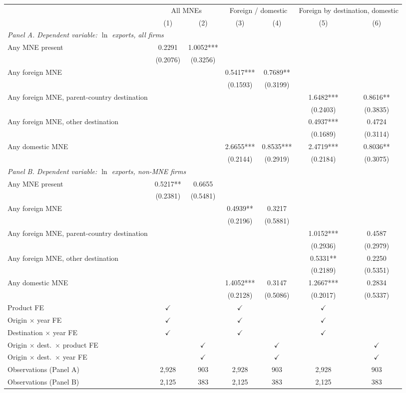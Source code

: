 \begin{tabular}{lcccccc} \hline
 & \multicolumn{2}{c}{All MNEs} & \multicolumn{2}{c}{Foreign / domestic} & \multicolumn{2}{c}{Foreign by destination, domestic} \\
 & (1) & (2) & (3) & (4) & (5) & (6) \\ \hline
\multicolumn{7}{l}{\textit{Panel A. Dependent variable: $\ln$ exports, all firms}} \\
Any MNE present & 0.2291 & 1.0052*** &  &  &  &  \\
 & (0.2076) & (0.3256) &  &  &  &  \\
Any foreign MNE &  &  & 0.5417*** & 0.7689** &  &  \\
 &  &  & (0.1593) & (0.3199) &  &  \\
Any foreign MNE, parent-country destination &  &  &  &  & 1.6482*** & 0.8616** \\
 &  &  &  &  & (0.2403) & (0.3835) \\
Any foreign MNE, other destination &  &  &  &  & 0.4937*** & 0.4724 \\
 &  &  &  &  & (0.1689) & (0.3114) \\
Any domestic MNE &  &  & 2.6655*** & 0.8535*** & 2.4719*** & 0.8036** \\
 &  &  & (0.2144) & (0.2919) & (0.2184) & (0.3075) \\
\midrule
\multicolumn{7}{l}{\textit{Panel B. Dependent variable: $\ln$ exports, non-MNE firms}} \\
Any MNE present & 0.5217** & 0.6655 &  &  &  &  \\
 & (0.2381) & (0.5481) &  &  &  &  \\
Any foreign MNE &  &  & 0.4939** & 0.3217 &  &  \\
 &  &  & (0.2196) & (0.5881) &  &  \\
Any foreign MNE, parent-country destination &  &  &  &  & 1.0152*** & 0.4587 \\
 &  &  &  &  & (0.2936) & (0.2979) \\
Any foreign MNE, other destination &  &  &  &  & 0.5331** & 0.2250 \\
 &  &  &  &  & (0.2189) & (0.5351) \\
Any domestic MNE &  &  & 1.4052*** & 0.3147 & 1.2667*** & 0.2834 \\
 &  &  & (0.2128) & (0.5086) & (0.2017) & (0.5337) \\
\hline
Product FE & $\checkmark$ &  & $\checkmark$ &  & $\checkmark$ &  \\
Origin $\times$ year FE & $\checkmark$ &  & $\checkmark$ &  & $\checkmark$ &  \\
Destination $\times$ year FE & $\checkmark$ &  & $\checkmark$ &  & $\checkmark$ &  \\
Origin $\times$ dest.\ $\times$ product FE &  & $\checkmark$ &  & $\checkmark$ &  & $\checkmark$ \\
Origin $\times$ dest.\ $\times$ year FE &  & $\checkmark$ &  & $\checkmark$ &  & $\checkmark$ \\
Observations (Panel A) & 2,928 & 903 & 2,928 & 903 & 2,928 & 903 \\
Observations (Panel B) & 2,125 & 383 & 2,125 & 383 & 2,125 & 383 \\
\hline
\end{tabular}
